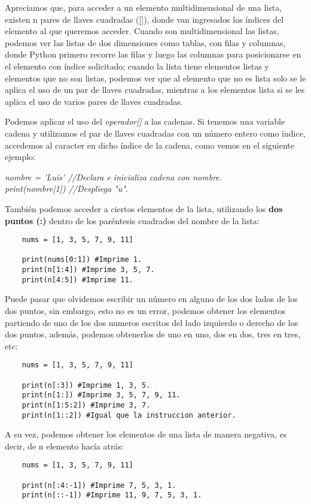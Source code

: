 Apreciamos que, para acceder a un elemento multidimensional de una lista, existen n pares de llaves cuadradas ([]), donde van ingresados los índices del elemento al que queremos acceder. Cuando son multidimensional las listas, podemos ver las listas de dos dimensiones como tablas, con filas y columnas, donde Python primero recorre las filas y luego las columnas para posicionarse en el elemento con índice solicitado; cuando la lista tiene elementos listas y elementos que no son listas, podemos ver que al elemento que no es lista solo se le aplica el uso de un par de llaves cuadradas, mientras a los elementos lista si se les aplica el uso de varios pares de llaves cuadradas.

Podemos aplicar el uso del \textit{operador[]} a las cadenas. Si tenemos una variable cadena y utilizamos el par de llaves cuadradas con un número entero como índice, accedemos al caracter en dicho índice de la cadena, como vemos en el siguiente ejemplo:
\begin{center}
	\textit{nombre = 'Luis' //Declara e inicializa cadena con nombre.\\print(nombre[1]) //Despliega "u".}
\end{center}

También podemos acceder a ciertos elementos de la lista, utilizando los \textbf{dos puntos (:)} dentro de los paréntesis cuadrados del nombre de la lista:
\begin{lstlisting}
	nums = [1, 3, 5, 7, 9, 11]
	
	print(nums[0:1]) #Imprime 1.
	print(n[1:4]) #Imprime 3, 5, 7.
	print(n[4:5]) #Imprime 11.
\end{lstlisting}

Puede pasar que olvidemos escribir un número en alguno de los dos lados de los dos puntos, sin embargo, esto no es un error, podemos obtener los elementos partiendo de uno de los dos numeros escritos del lado izquierdo o derecho de los dos puntos, además, podemos obtenerlos de uno en uno, dos en dos, tres en tres, etc:
\begin{lstlisting}
	nums = [1, 3, 5, 7, 9, 11]
	
	print(n[:3]) #Imprime 1, 3, 5.
	print(n[1:]) #Imprime 3, 5, 7, 9, 11.
	print(n[1:5:2]) #Imprime 3, 7.
	print(n[1::2]) #Igual que la instruccion anterior.
\end{lstlisting}

A su vez, podemos obtener los elementos de una lista de manera negativa, es decir, de n elemento hacía atrás:
\begin{lstlisting}
	nums = [1, 3, 5, 7, 9, 11]
	
	print(n[:4:-1]) #Imprime 7, 5, 3, 1.
	print(n[::-1]) #Imprime 11, 9, 7, 5, 3, 1.
\end{lstlisting}


